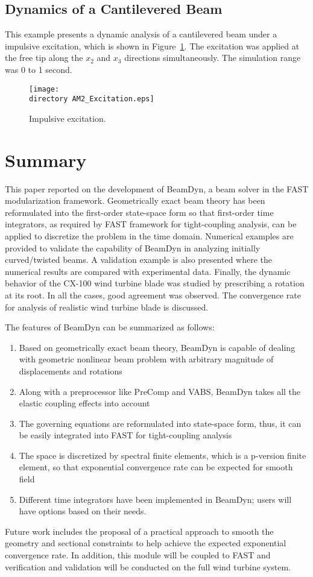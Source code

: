 \documentclass{aiaa-tc}
\def\directory{EPSF/}
\begin{document}
\subsection{Dynamics of a Cantilevered Beam}
This example presents a dynamic analysis of a cantilevered beam under a impulsive excitation, which is shown in Figure~\ref{Impulsive}. The excitation was applied at the free tip along the $x_2$ and $x_3$ directions simultaneously. The simulation range was 0 to 1 second.
\begin{figure}
\centering
\texttt{[image: \\directory AM2\_Excitation.eps]}
\caption{ Impulsive excitation.} 
\label{Impulsive}
\end{figure}


 \section{Summary}
  This paper reported on the development of BeamDyn, a beam solver in the FAST modularization framework. Geometrically exact beam theory has been reformulated into the first-order state-space form so that first-order time integrators, as required by FAST framework for tight-coupling analysis, can be applied to discretize the problem in the time domain. Numerical examples are provided to validate the capability of BeamDyn in analyzing initially curved/twisted beams. A validation example is also presented where the numerical results are compared with experimental data. Finally, the dynamic behavior of the CX-100 wind turbine blade was studied by prescribing a rotation at its root. In all the cases, good agreement was observed.  The convergence rate for analysis of realistic wind turbine blade is discussed. {\color{red} The features of BeamDyn can be summarized as follows:
  \begin{enumerate}
  \item Based on geometrically exact beam theory, BeamDyn is capable of dealing with geometric nonlinear beam problem with arbitrary magnitude of displacements and rotations
  \item Along with a preprocessor like PreComp and VABS, BeamDyn takes all the elastic coupling effects into account
  \item The governing equations are reformulated into state-space form, thus, it can be easily integrated into FAST for tight-coupling analysis
  \item The space is discretized by spectral finite elements, which is a p-version finite element, so that exponential convergence rate can be expected for smooth field
  \item Different time integrators have been implemented in BeamDyn; users will have options based on their needs.
  \end{enumerate}}
   Future work includes the proposal of a practical approach to smooth the geometry and sectional constraints to help achieve the expected exponential convergence rate. In addition, this module will be coupled to FAST and verification and validation will be conducted on the full wind turbine system. 
  
\end{document}
